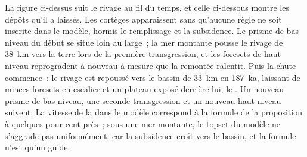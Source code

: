 La figure ci-dessus suit le rivage au fil du temps, et celle ci-dessous
montre les dépôts qu'il a laissés. Les cortèges apparaissent sans qu'aucune règle
ne soit inscrite dans le modèle, hormis le remplissage et la subsidence. Le prisme de bas niveau du début se situe loin
au large~; la mer montante pousse le rivage de \qty{38}{km} vers la terre lors de la
première transgression, et les foresets de haut niveau reprogradent à nouveau à mesure que la remontée ralentit.
Puis la chute commence~: le rivage est repoussé vers le bassin de \qty{33}{km} en
\qty{187}{ka}, laissant de minces foresets en escalier et un plateau
exposé derrière lui, le . Un nouveau prisme de bas niveau, une seconde transgression
et un nouveau haut niveau suivent. La vitesse de la  dans le modèle
correspond à la formule de la proposition à quelques pour cent près~; sous une
mer montante, le topset du modèle ne s'aggrade pas uniformément, car la subsidence
croît vers le bassin, et la formule n'est qu'un guide.


